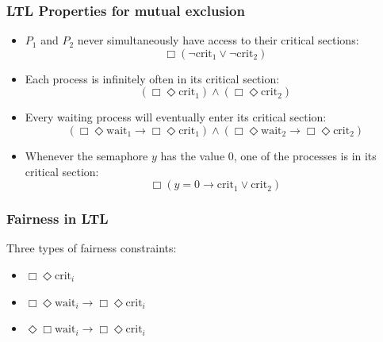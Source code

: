 \documentclass[11pt]{article}
\theoremstyle{definition}
\begin{document}
\subsubsection{LTL Properties for mutual exclusion}
\begin{itemize}
\item $P_{1}$ and $P_{2}$ never simultaneously have access to their critical sections:
\begin{equation}
\Box (\neg \text{crit}_{1} \vee \neg \text{crit}_{2})
\end{equation}

\item Each process is infinitely often in its critical section:
\begin{equation}
(\Box \Diamond \text{crit}_{1}) \wedge (\Box \Diamond \text{crit}_{2})
\end{equation}

\item Every waiting process will eventually enter its critical section:
\begin{equation}
(\Box \Diamond \text{wait}_{1} \rightarrow \Box \Diamond \text{crit}_{1}) \wedge (\Box \Diamond \text{wait}_{2} \rightarrow \Box \Diamond \text{crit}_{2})
\end{equation}

\item Whenever the semaphore $y$ has the value 0, one of the processes is in its critical section:
\begin{equation}
\Box (y = 0 \rightarrow \text{crit}_{1} \vee \text{crit}_{2})
\end{equation}
\end{itemize}

\subsubsection{Fairness in LTL}
Three types of fairness constraints:
\begin{itemize}
\item{} $\Box \Diamond \text{crit}_{i}$
\item{} $\Box \Diamond \text{wait}_{i} \rightarrow \Box \Diamond \text{crit}_{i}$
\item{} $\Diamond \Box \text{wait}_{i} \rightarrow \Box \Diamond \text{crit}_{i}$
\end{itemize}
\end{document}
